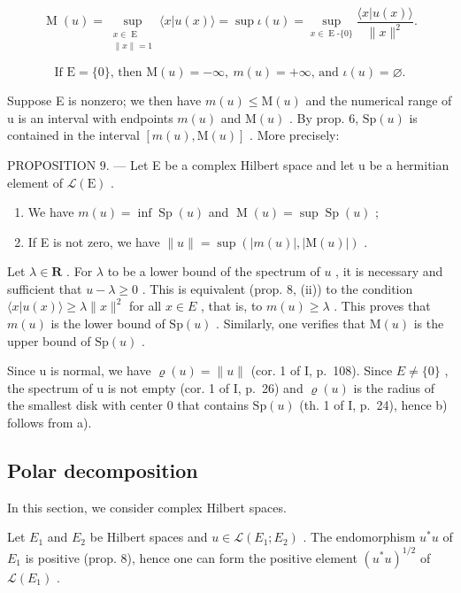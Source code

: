 \[
\operatorname{M}(u) = \sup_{\substack{x\in \operatorname{E}\\ \| x\| = 1}}\langle x|u(x)\rangle = \sup \iota (u) = \sup_{x\in \operatorname{E}\text{-}\{0\}}\frac{\langle x|u(x)\rangle}{\|x\|^ {2}}.
\]

\[
\text{If } \mathrm{E} = \{0\}\text{, then } \mathrm{M}(u) = -\infty,\ m(u) = +\infty\text{, and } \iota(u) = \varnothing.
\]

Suppose E is nonzero; we then have \(m(u) \leqslant \mathrm{M}(u)\) and the numerical range of u is an interval with endpoints \(m(u)\) and \(\mathrm{M}(u)\) . By prop. 6, \(\mathrm{Sp}(u)\) is contained in the interval \([m(u), \mathrm{M}(u)]\) . More precisely:

PROPOSITION 9. --- Let E be a complex Hilbert space and let u be a hermitian element of \(\mathcal{L}(\mathrm{E})\) .

\begin{enumerate}
\def\labelenumi{\alph{enumi})}
\item
  We have \(m(u) = \inf \operatorname{Sp}(u)\) and \(\operatorname{M}(u) = \sup \operatorname{Sp}(u)\) ;
\item
  If E is not zero, we have \(\|u\|=\sup(|m(u)|,|\mathrm{M}(u)|)\) .
\end{enumerate}

Let \(\lambda \in \mathbf{R}\) . For \(\lambda\) to be a lower bound of the spectrum of \(u\) , it is necessary and sufficient that \(u - \lambda \geqslant 0\) . This is equivalent (prop. 8, (ii)) to the condition \(\langle x|u(x)\rangle \geqslant \lambda \|x\|^2\) for all \(x \in E\) , that is, to \(m(u) \geqslant \lambda\) . This proves that \(m(u)\) is the lower bound of \(\mathrm{Sp}(u)\) . Similarly, one verifies that \(\mathrm{M}(u)\) is the upper bound of \(\mathrm{Sp}(u)\) .

Since u is normal, we have \(\varrho(u)=\|u\|\) (cor. 1 of I, p.~108). Since \(E\neq\{0\}\) , the spectrum of u is not empty (cor. 1 of I, p.~26) and \(\varrho(u)\) is the radius of the smallest disk with center 0 that contains \(\mathrm{Sp}(u)\) (th. 1 of I, p.~24), hence b) follows from a).

\subsection{Polar decomposition}

In this section, we consider complex Hilbert spaces.

Let \(E_{1}\) and \(E_{2}\) be Hilbert spaces and \(u \in \mathcal{L}(E_{1}; E_{2})\) . The endomorphism \(u^{*}u\) of \(E_{1}\) is positive (prop. 8), hence one can form the positive element \((u^{*}u)^{1/2}\) of \(\mathcal{L}(E_{1})\) .

